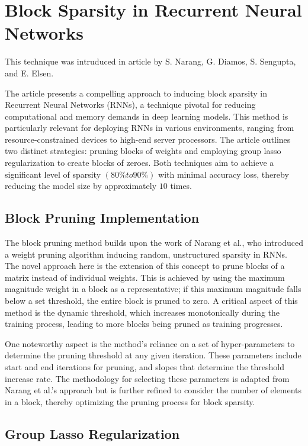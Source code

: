 \section{Block Sparsity in Recurrent Neural Networks}
This technique was intruduced in article \cite{block} by S. Narang, G. Diamos, S. Sengupta, and E. Elsen.

The article presents a compelling approach to inducing block sparsity in Recurrent Neural Networks (RNNs), a technique pivotal for reducing computational and memory demands in deep learning models. This method is particularly relevant for deploying RNNs in various environments, ranging from resource-constrained devices to high-end server processors. The article outlines two distinct strategies: pruning blocks of weights and employing group lasso regularization to create blocks of zeroes. Both techniques aim to achieve a significant level of sparsity $(80\% to 90\%)$ with minimal accuracy loss, thereby reducing the model size by approximately $10$ times.

\subsection{Block Pruning Implementation}

The block pruning method builds upon the work \cite{narang} of Narang et al., who introduced a weight pruning algorithm inducing random, unstructured sparsity in RNNs. The novel approach here is the extension of this concept to prune blocks of a matrix instead of individual weights. This is achieved by using the maximum magnitude weight in a block as a representative; if this maximum magnitude falls below a set threshold, the entire block is pruned to zero. A critical aspect of this method is the dynamic threshold, which increases monotonically during the training process, leading to more blocks being pruned as training progresses.

One noteworthy aspect is the method's reliance on a set of hyper-parameters to determine the pruning threshold at any given iteration. These parameters include start and end iterations for pruning, and slopes that determine the threshold increase rate. The methodology for selecting these parameters is adapted from Narang et al.'s approach but is further refined to consider the number of elements in a block, thereby optimizing the pruning process for block sparsity.

\subsection{Group Lasso Regularization}

